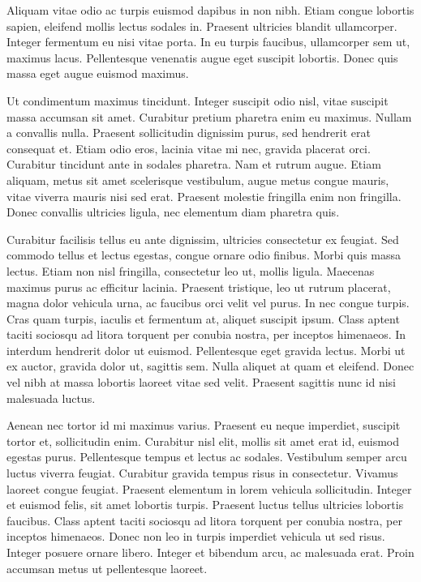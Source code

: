 \documentclass[12pt, english]{article}
\begin{document}
Aliquam vitae odio ac turpis euismod dapibus in non nibh. Etiam congue lobortis sapien, eleifend mollis lectus sodales in. Praesent ultricies blandit ullamcorper. Integer fermentum eu nisi vitae porta. In eu turpis faucibus, ullamcorper sem ut, maximus lacus. Pellentesque venenatis augue eget suscipit lobortis. Donec quis massa eget augue euismod maximus.

Ut condimentum maximus tincidunt. Integer suscipit odio nisl, vitae suscipit massa accumsan sit amet. Curabitur pretium pharetra enim eu maximus. Nullam a convallis nulla. Praesent sollicitudin dignissim purus, sed hendrerit erat consequat et. Etiam odio eros, lacinia vitae mi nec, gravida placerat orci. Curabitur tincidunt ante in sodales pharetra. Nam et rutrum augue. Etiam aliquam, metus sit amet scelerisque vestibulum, augue metus congue mauris, vitae viverra mauris nisi sed erat. Praesent molestie fringilla enim non fringilla. Donec convallis ultricies ligula, nec elementum diam pharetra quis.

Curabitur facilisis tellus eu ante dignissim, ultricies consectetur ex feugiat. Sed commodo tellus et lectus egestas, congue ornare odio finibus. Morbi quis massa lectus. Etiam non nisl fringilla, consectetur leo ut, mollis ligula. Maecenas maximus purus ac efficitur lacinia. Praesent tristique, leo ut rutrum placerat, magna dolor vehicula urna, ac faucibus orci velit vel purus. In nec congue turpis. Cras quam turpis, iaculis et fermentum at, aliquet suscipit ipsum. Class aptent taciti sociosqu ad litora torquent per conubia nostra, per inceptos himenaeos. In interdum hendrerit dolor ut euismod. Pellentesque eget gravida lectus. Morbi ut ex auctor, gravida dolor ut, sagittis sem. Nulla aliquet at quam et eleifend. Donec vel nibh at massa lobortis laoreet vitae sed velit. Praesent sagittis nunc id nisi malesuada luctus.

Aenean nec tortor id mi maximus varius. Praesent eu neque imperdiet, suscipit tortor et, sollicitudin enim. Curabitur nisl elit, mollis sit amet erat id, euismod egestas purus. Pellentesque tempus et lectus ac sodales. Vestibulum semper arcu luctus viverra feugiat. Curabitur gravida tempus risus in consectetur. Vivamus laoreet congue feugiat. Praesent elementum in lorem vehicula sollicitudin. Integer et euismod felis, sit amet lobortis turpis. Praesent luctus tellus ultricies lobortis faucibus. Class aptent taciti sociosqu ad litora torquent per conubia nostra, per inceptos himenaeos. Donec non leo in turpis imperdiet vehicula ut sed risus. Integer posuere ornare libero. Integer et bibendum arcu, ac malesuada erat. Proin accumsan metus ut pellentesque laoreet. 

\nocite{*}
\newpage
\printbibliography
\end{document}
